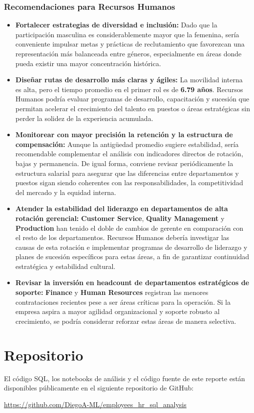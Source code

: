 \documentclass{article}
\begin{document}
\subsubsection*{Recomendaciones para Recursos Humanos}
\begin{itemize}
    \item \textbf{Fortalecer estrategias de diversidad e inclusión:} Dado que la participación masculina es considerablemente mayor que la femenina, sería conveniente impulsar metas y prácticas de reclutamiento que favorezcan una representación más balanceada entre géneros, especialmente en áreas donde pueda existir una mayor concentración histórica.

    \item \textbf{Diseñar rutas de desarrollo más claras y ágiles:} La movilidad interna es alta, pero el tiempo promedio en el primer rol es de \textbf{6.79 años}. Recursos Humanos podría evaluar programas de desarrollo, capacitación y sucesión que permitan acelerar el crecimiento del talento en puestos o áreas estratégicas sin perder la solidez de la experiencia acumulada.

    \item \textbf{Monitorear con mayor precisión la retención y la estructura de compensación:} Aunque la antigüedad promedio sugiere estabilidad, sería recomendable complementar el análisis con indicadores directos de rotación, bajas y permanencia. De igual forma, conviene revisar periódicamente la estructura salarial para asegurar que las diferencias entre departamentos y puestos sigan siendo coherentes con las responsabilidades, la competitividad del mercado y la equidad interna.

    \item \textbf{Atender la estabilidad del liderazgo en departamentos de alta rotación gerencial:} \textbf{Customer Service}, \textbf{Quality Management} y \textbf{Production} han tenido el doble de cambios de gerente en comparación con el resto de los departamentos. Recursos Humanos debería investigar las causas de esta rotación e implementar programas de desarrollo de liderazgo y planes de sucesión específicos para estas áreas, a fin de garantizar continuidad estratégica y estabilidad cultural.

    \item \textbf{Revisar la inversión en headcount de departamentos estratégicos de soporte:} \textbf{Finance} y \textbf{Human Resources} registran las menores contrataciones recientes pese a ser áreas críticas para la operación. Si la empresa aspira a mayor agilidad organizacional y soporte robusto al crecimiento, se podría considerar reforzar estas áreas de manera selectiva.
\end{itemize}

\newpage
\section{Repositorio}

El código SQL, los notebooks de análisis y el código fuente de este reporte están disponibles públicamente en el siguiente repositorio de GitHub:

\begin{center}
\url{https://github.com/DiegoA-ML/employees_hr_sql_analysis}
\end{center}
\end{document}
